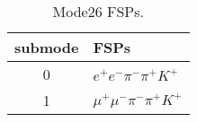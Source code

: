 \begin{table}[h!]
\begin{center}
\begin{tabular}{cl}
\hline
submode& FSPs\\
\hline
0 & $e^+ e^- \pi^- \pi^+ K^+ $ \\
1 & $\mu^+ \mu^- \pi^- \pi^+ K^+ $ \\
\hline
\end{tabular}
\label{tab:Mode26FSPs}
\caption{Mode26 FSPs.}
\end{center}
\end{table}
